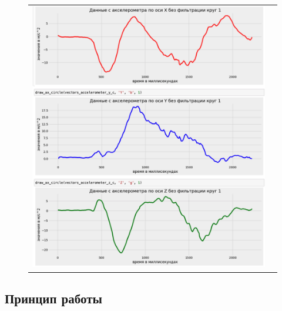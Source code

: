 \begin{figure}[H]
    \begin{center}
        \begin{tabular}{cc}
            \includegraphics[width=1\textwidth]{farim/cirx} & 
        \end{tabular}
    \end{center}
\end{figure}

\newpage
\subsection{Принцип работы}

